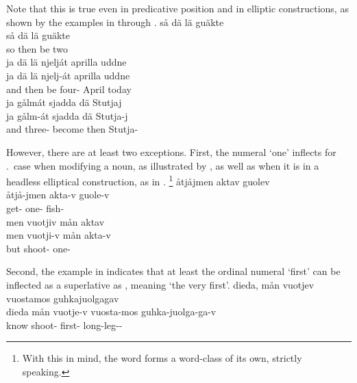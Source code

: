 Note that this is true even in predicative position and in elliptic constructions, as shown by the examples in  through .
\ea\label{numeralEx3}%
\glll	så dä lä guäkte\\
	så dä lä guäkte\\
	so then be\BS{} two\\\nopagebreak
{}	
\z
\ea\label{numeralEx2}%
\glll	ja dä lä njelját aprilla uddne\\
	ja dä lä njelj-át aprilla uddne\\
	and then be\BS{} four- April today\\\nopagebreak
{}	
\z
\ea\label{numeralEx4}%
\glll	ja gålmát sjadda dä Stutjaj\\
	ja gålm-át sjadda dä Stutja-j\\
	and three- become\BS{} then Stutja-\\\nopagebreak
{}	
\z

However, there are at least two exceptions. First, the numeral  ‘one’ inflects for \ACCs.\SGs\ case when modifying a noun, as illustrated by , as well as when it is in a headless elliptical construction, as in .%
\footnote{With this in mind, the word  forms a word-class of its own, strictly speaking.}
\ea\label{numOneEx1}
\glll	åtjåjmen aktav guolev\\
	åtjå-jmen akta-v guole-v\\
	get- one- fish-\\\nopagebreak
{}	
\z
\ea\label{numOneEx2}
\glll	men vuotjiv mån aktav\\
	men vuotji-v mån akta-v\\
	but shoot-  one-\\\nopagebreak
{}	
\z

Second, the example in  indicates that at least the ordinal numeral  ‘first’ can be inflected as a superlative as , meaning ‘the very first’. 
\ea\label{veryFirstEx}%
\glll	dieda, mån vuotjev vuostamos guhkajuolgagav\\
	dieda mån vuotje-v vuosta-mos guhka-juolga-ga-v\\
	know\BS{}  shoot- first- long-leg--\\\nopagebreak
{}	
\z






%